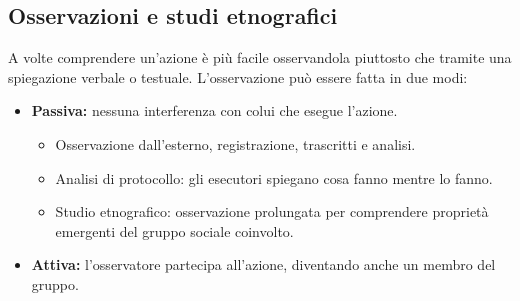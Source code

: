 \documentclass[../main.tex]{subfiles}
\begin{document}
\subsection{Osservazioni e studi etnografici}
A volte comprendere un'azione è più facile osservandola piuttosto che tramite una spiegazione verbale o testuale.
L'osservazione può essere fatta in due modi:
\begin{itemize}
	\item \textbf{Passiva:} nessuna interferenza con colui che esegue l'azione.
	\begin{itemize}
		\item Osservazione dall'esterno, registrazione, trascritti e analisi.
		\item Analisi di protocollo: gli esecutori spiegano cosa fanno mentre lo fanno.
		\item Studio etnografico: osservazione prolungata per comprendere proprietà emergenti del gruppo sociale coinvolto.
	\end{itemize}
	\item \textbf{Attiva:} l'osservatore partecipa all'azione, diventando anche un membro del gruppo.
\end{itemize}
\end{document}
